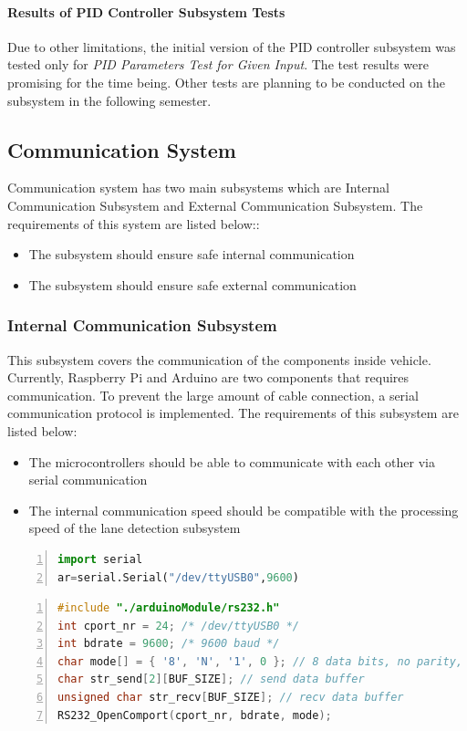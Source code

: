 \documentclass[a4paper,12pt]{article}
\begin{document}
		
		
	\paragraph{Results of PID Controller Subsystem Tests}
	
		Due to other limitations, the initial version of the PID controller subsystem was tested only for \textit{PID Parameters Test for Given Input}. The test results were promising for the time being. Other tests are planning to be conducted on the subsystem in the following semester.
	
	\subsection{Communication System}
	
	Communication system has two main subsystems which are Internal Communication Subsystem and External Communication  Subsystem. The requirements of this system are listed below::
	\begin{itemize}
		\item The subsystem should ensure safe internal communication
		\item The subsystem should ensure safe external communication
	\end{itemize}
	
	
	
	\subsubsection{Internal Communication Subsystem}
	This subsystem covers the communication of the components inside vehicle. Currently, Raspberry Pi and Arduino are two components that requires communication. To prevent the large amount of cable connection, a serial communication protocol is implemented. The requirements of this subsystem are listed below:
	\begin{itemize}
		\item The microcontrollers should be able to communicate with each other via serial communication
		\item The internal communication speed should be compatible with the processing speed of the lane detection subsystem  
	\end{itemize}
		\begin{lstlisting}[language=Python,float=h!,numbers=left,frame=single,caption=Serial object decleration in Python,label=sc:serial_python, captionpos=b ] 
import serial
ar=serial.Serial("/dev/ttyUSB0",9600)
		\end{lstlisting}
		 \begin{lstlisting}[language=C,float=h!,numbers=left,frame=single,caption=Serial communication setup in C,label=sc:serial_c, captionpos=b ] 
#include "./arduinoModule/rs232.h"
int cport_nr = 24; /* /dev/ttyUSB0 */
int bdrate = 9600; /* 9600 baud */
char mode[] = { '8', 'N', '1', 0 }; // 8 data bits, no parity, 1 stop bit
char str_send[2][BUF_SIZE]; // send data buffer
unsigned char str_recv[BUF_SIZE]; // recv data buffer
RS232_OpenComport(cport_nr, bdrate, mode);
		\end{lstlisting}
\end{document}

